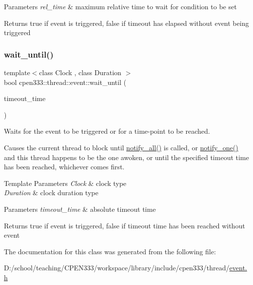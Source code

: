 \begin{DoxyParams}{Parameters}
{\em rel\+\_\+time} & maximum relative time to wait for condition to be set \\
\hline
\end{DoxyParams}
\begin{DoxyReturn}{Returns}
{\ttfamily true} if event is triggered, {\ttfamily false} if timeout has elapsed without event being triggered 
\end{DoxyReturn}
\mbox{\label{classcpen333_1_1thread_1_1event_aeea6876ad13a451c66868849fa23ec16}} 
\subsubsection{\texorpdfstring{wait\+\_\+until()}{wait\_until()}}
{\footnotesize\ttfamily template$<$class Clock , class Duration $>$ \\
bool cpen333\+::thread\+::event\+::wait\+\_\+until (\begin{DoxyParamCaption}\item[{const std\+::chrono\+::time\+\_\+point$<$ Clock, Duration $>$ \&}]{timeout\+\_\+time }\end{DoxyParamCaption})\hspace{0.3cm}{\ttfamily [inline]}}



Waits for the event to be triggered or for a time-\/point to be reached. 

Causes the current thread to block until {\ttfamily \hyperlink{classcpen333_1_1thread_1_1event_ac41756fc84760cd537c78de31b3b25fa}{notify\+\_\+all()}} is called, or {\ttfamily \hyperlink{classcpen333_1_1thread_1_1event_a453552a68dff5c45321496e452495364}{notify\+\_\+one()}} and this thread happens to be the one awoken, or until the specified timeout time has been reached, whichever comes first.


\begin{DoxyTemplParams}{Template Parameters}
{\em Clock} & clock type \\
\hline
{\em Duration} & clock duration type \\
\hline
\end{DoxyTemplParams}

\begin{DoxyParams}{Parameters}
{\em timeout\+\_\+time} & absolute timeout time \\
\hline
\end{DoxyParams}
\begin{DoxyReturn}{Returns}
{\ttfamily true} if event is triggered, {\ttfamily false} if timeout time has been reached without event 
\end{DoxyReturn}


The documentation for this class was generated from the following file\+:\begin{DoxyCompactItemize}
\item 
D\+:/school/teaching/\+C\+P\+E\+N333/workspace/library/include/cpen333/thread/\hyperlink{thread_2event_8h}{event.\+h}\end{DoxyCompactItemize}
